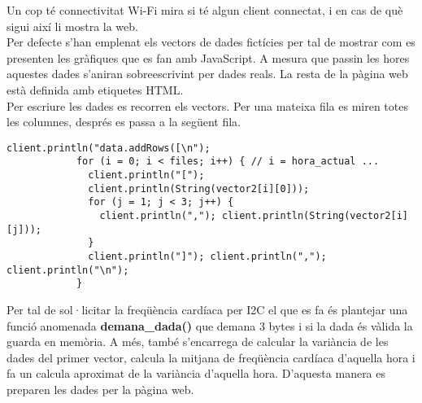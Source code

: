 \begin{spacing}{1.5}

\noindent Un cop té connectivitat Wi-Fi mira si té algun client connectat, i en cas de què sigui així li mostra la web.\\
\newline Per defecte s'han emplenat els vectors de dades fictícies per tal de mostrar com es presenten les gràfiques que es fan amb JavaScript. A mesura que passin les hores aquestes dades s'aniran sobreescrivint per dades reals. La resta de la pàgina web està definida amb etiquetes HTML.\\
\newline Per escriure les dades es recorren els vectors. Per una mateixa fila es miren totes les columnes, després es passa a la següent fila.
\end{spacing}
\begin{spacing}{1}
\begin{lstlisting}[style=myArduino]
            client.println("data.addRows([\n"); 
            for (i = 0; i < files; i++) { // i = hora_actual ...
              client.println("[");
              client.println(String(vector2[i][0]));
              for (j = 1; j < 3; j++) {
                client.println(","); client.println(String(vector2[i][j]));
              }
              client.println("]"); client.println(","); client.println("\n");
            }
\end{lstlisting}

\end{spacing}
\begin{spacing}{1.5}
%
\noindent Per tal de sol·licitar la freqüència cardíaca per I2C el que es fa és plantejar una funció anomenada \textbf{demana\_dada()} que demana 3 bytes i si la dada és vàlida la guarda en memòria. A més, també s'encarrega de calcular la variància de les dades del primer vector, calcula la mitjana de freqüència cardíaca d'aquella hora i fa un calcula aproximat de la variància d'aquella hora. D'aquesta manera es preparen les dades per la pàgina web.
\end{spacing}
